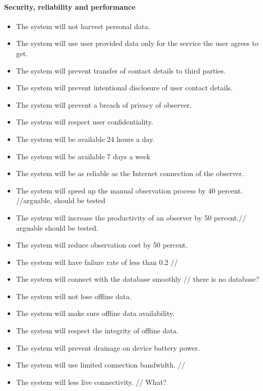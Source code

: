     \paragraph{Security, reliability and performance}
	\begin{itemize}
		\item The system will not harvest personal data.
        \item The system will use user provided data only for the service the user agrees to get.
        \item The system will prevent transfer of contact details to third parties.
        \item The system will prevent intentional disclosure of user contact details.
        \item The system will prevent a breach of privacy of observer.
        \item The system will respect user confidentiality.
        \item The system will be available 24 hours a day.
        \item The system will be available 7 days a week
        \item The system will be as reliable as the Internet connection of the observer.
        \item The system will speed up the manual observation process by 40 percent. //arguable, should be tested
        \item The system will increase the productivity of an observer by 50 percent.// arguable should be tested.
        \item The system will reduce observation cost by 50 percent.
        \item The system will have failure rate of less than 0.2 %
//        \item The system will connect with the database smoothly // there is no database?
        \item The system will not lose offline data.
        \item The system will make sure offline data availability.
        \item The system will respect the integrity of offline data.
        \item The system will prevent drainage on device battery power.
        \item The system will use limited connection bandwidth.
//        \item The system will less live connectivity. // What?

\end{itemize}
